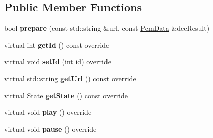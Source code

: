 \subsection*{Public Member Functions}
\begin{DoxyCompactItemize}
\item 
\mbox{\label{classcocos2d_1_1experimental_1_1PcmAudioPlayer_a27cca9ac7d83d3702345a25e7fd4bb04}} 
bool {\bfseries prepare} (const std\+::string \&url, const \hyperlink{structcocos2d_1_1experimental_1_1PcmData}{Pcm\+Data} \&dec\+Result)
\item 
\mbox{\label{classcocos2d_1_1experimental_1_1PcmAudioPlayer_a9e333a888adcdeed3877b5b4bdedafe3}} 
virtual int {\bfseries get\+Id} () const override
\item 
\mbox{\label{classcocos2d_1_1experimental_1_1PcmAudioPlayer_a32251b0836c02742d862ab9f223b13d7}} 
virtual void {\bfseries set\+Id} (int id) override
\item 
\mbox{\label{classcocos2d_1_1experimental_1_1PcmAudioPlayer_a9b4159b6db3583e4a8712a7448870540}} 
virtual std\+::string {\bfseries get\+Url} () const override
\item 
\mbox{\label{classcocos2d_1_1experimental_1_1PcmAudioPlayer_ae71df571860c106cdb5beef74a89483d}} 
virtual State {\bfseries get\+State} () const override
\item 
\mbox{\label{classcocos2d_1_1experimental_1_1PcmAudioPlayer_a224237f443dd51f7cdb5edb36addfad5}} 
virtual void {\bfseries play} () override
\item 
\mbox{\label{classcocos2d_1_1experimental_1_1PcmAudioPlayer_a505a1e824c30c9389aca270fa402f295}} 
virtual void {\bfseries pause} () override
\item 
\mbox{\label{classcocos2d_1_1experimental_1_1PcmAudioPlayer_ad49ea8662c642893ea7d5ce181eb21aa}} 

\end{DoxyCompactItemize}
